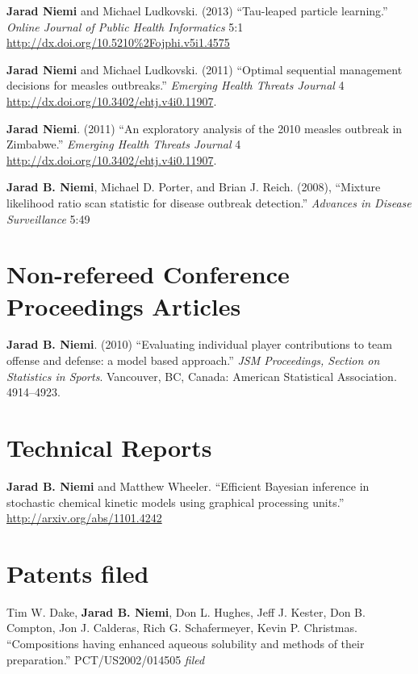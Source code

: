 \documentclass[overlapped,line,letterpaper]{res}
\begin{document}
\begin{resume}
{\bf Jarad Niemi} and Michael Ludkovski. (2013) ``Tau-leaped particle learning.'' \emph{Online Journal of Public Health Informatics} 5:1 \url{http://dx.doi.org/10.5210%2Fojphi.v5i1.4575}

{\bf Jarad Niemi} and Michael Ludkovski. (2011) ``Optimal sequential management decisions for measles outbreaks.'' \emph{Emerging Health Threats Journal} 4 \url{http://dx.doi.org/10.3402/ehtj.v4i0.11907}.

{\bf Jarad Niemi}. (2011) ``An exploratory analysis of the 2010 measles outbreak in Zimbabwe.'' \emph{Emerging Health Threats Journal} 4 \url{http://dx.doi.org/10.3402/ehtj.v4i0.11907}.

{\bf Jarad B. Niemi}, Michael D. Porter, and Brian J. Reich. (2008), ``Mixture likelihood ratio scan statistic for disease outbreak detection.'' \emph{Advances in Disease Surveillance} 5:49

\section{\bf Non-refereed Conference Proceedings Articles}

{\bf Jarad B. Niemi}. (2010) ``Evaluating individual player contributions to team offense and defense: a model based approach.'' \emph{JSM Proceedings, Section on Statistics in Sports}. Vancouver, BC, Canada: American Statistical Association. 4914--4923.

\section{\bf Technical Reports}

{\bf Jarad B. Niemi} and Matthew Wheeler. ``Efficient Bayesian inference in stochastic chemical kinetic models using graphical processing units.'' \url{http://arxiv.org/abs/1101.4242}

\section{Patents filed}

Tim W. Dake, {\bf Jarad B. Niemi}, Don L. Hughes, Jeff J. Kester, Don B. Compton, Jon J. Calderas, Rich G. Schafermeyer, Kevin P. Christmas. ``Compositions having enhanced aqueous solubility and methods of their preparation.'' PCT/US2002/014505 \emph{filed}



\end{resume}
\end{document}
